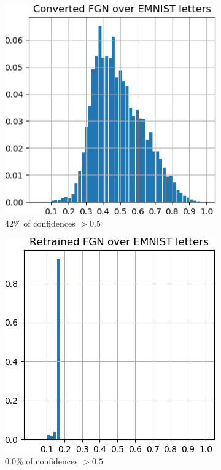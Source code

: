 \documentclass[12pt,oneside]{CUNY_PhD}
\begin{document}
\begin{figure}[!h]
\begin{subfigure}[t]{0.32\textwidth}
        \includegraphics[width=\textwidth]{images/Letters/hist-converted-letters.png}
        \caption*{42\% of confidences $>0.5$}
    \end{subfigure}
    \begin{subfigure}[t]{0.32\textwidth}
        \includegraphics[width=\textwidth]{images/Letters/hist-retrained-letters.png}
        \caption*{0.0\% of confidences $>0.5$}
    \end{subfigure}
    \caption{}
    \label{fig:hist-letters}
\end{figure}
\end{document}
